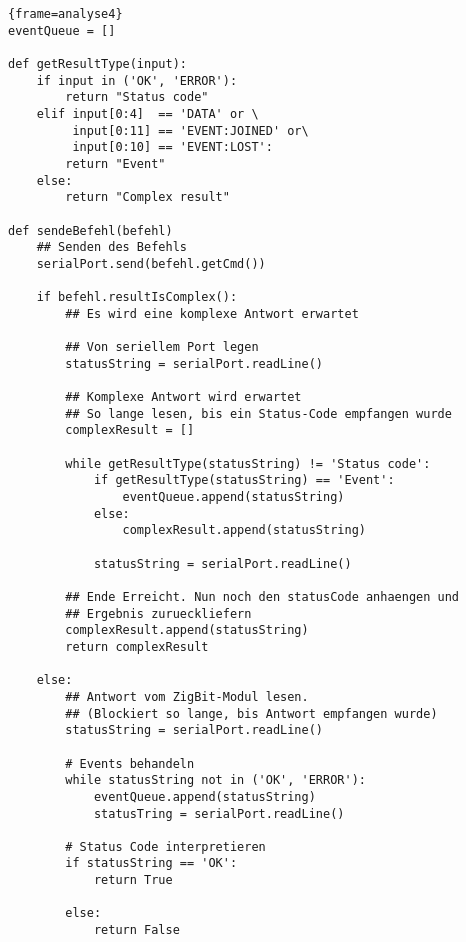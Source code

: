             \begin{lstlisting}{frame=analyse4}
eventQueue = []

def getResultType(input):
    if input in ('OK', 'ERROR'):
        return "Status code"
    elif input[0:4]  == 'DATA' or \
         input[0:11] == 'EVENT:JOINED' or\ 
         input[0:10] == 'EVENT:LOST':
        return "Event"
    else:
        return "Complex result"

def sendeBefehl(befehl)
    ## Senden des Befehls
    serialPort.send(befehl.getCmd())

    if befehl.resultIsComplex():
        ## Es wird eine komplexe Antwort erwartet

        ## Von seriellem Port legen
        statusString = serialPort.readLine()

        ## Komplexe Antwort wird erwartet
        ## So lange lesen, bis ein Status-Code empfangen wurde
        complexResult = []
        
        while getResultType(statusString) != 'Status code':
            if getResultType(statusString) == 'Event':
                eventQueue.append(statusString)
            else:
                complexResult.append(statusString)

            statusString = serialPort.readLine()

        ## Ende Erreicht. Nun noch den statusCode anhaengen und
        ## Ergebnis zurueckliefern
        complexResult.append(statusString)
        return complexResult

    else:
        ## Antwort vom ZigBit-Modul lesen.
        ## (Blockiert so lange, bis Antwort empfangen wurde)
        statusString = serialPort.readLine()

        # Events behandeln 
        while statusString not in ('OK', 'ERROR'):
            eventQueue.append(statusString)
            statusTring = serialPort.readLine()

        # Status Code interpretieren
        if statusString == 'OK':
            return True
        
        else:
            return False

            \end{lstlisting}


